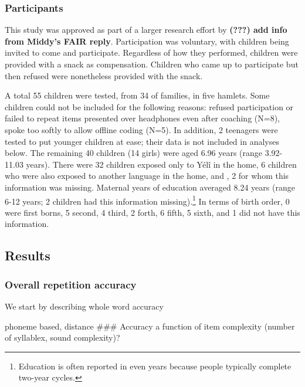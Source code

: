 \documentclass[english,,man,floatsintext]{apa6}
\begin{document}
\hypertarget{participants}{%
\subsubsection{Participants}\label{participants}}

This study was approved as part of a larger research effort by \textbf{({\textbf{???}}) add info from Middy's FAIR reply}. Participation was voluntary, with children being invited to come and participate. Regardless of how they performed, children were provided with a snack as compensation. Children who came up to participate but then refused were nonetheless provided with the snack.

A total 55 children were tested, from 34 of families, in five hamlets. Some children could not be included for the following reasons: refused participation or failed to repeat items presented over headphones even after coaching (N=8), spoke too softly to allow offline coding (N=5). In addition, 2 teenagers were tested to put younger children at ease; their data is not included in analyses below. The remaining 40 children (14 girls) were aged 6.96 years (range 3.92-11.03 years). There were 32 children exposed only to Yélî in the home, 6 children who were also exposed to another language in the home, and , 2 for whom this information was missing. Maternal years of education averaged 8.24 years (range 6-12 years; 2 children had this information missing).\footnote{Education is often reported in even years because people typically complete two-year cycles.} In terms of birth order, 0 were first borns, 5 second, 4 third, 2 forth, 6 fifth, 5 sixth, and 1 did not have this information.

\hypertarget{results}{%
\subsection{Results}\label{results}}

\hypertarget{overall-repetition-accuracy}{%
\subsubsection{Overall repetition accuracy}\label{overall-repetition-accuracy}}

We start by describing whole word accuracy

phoneme based, distance
\#\#\# Accuracy a function of item complexity
(number of syllablex, sound complexity)?
\end{document}
